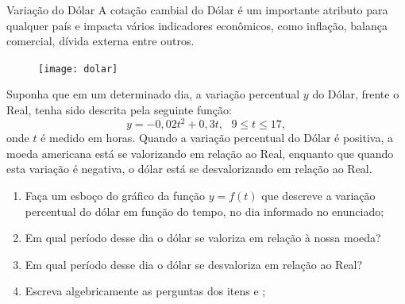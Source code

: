 \label{\detokenize{AF107-8:inequacoes-grau2}}\label{\detokenize{AF107-8::doc}}

\begin{task}{Variação do Dólar}
A cotação cambial do Dólar é um importante atributo para qualquer país e impacta vários indicadores econômicos, como inflação, balança comercial, dívida externa entre outros. 

\begin{figure}[H]
\centering
\noindent\texttt{[image: dolar]}
\end{figure}

Suponha que em um determinado dia, a variação percentual $y$ do Dólar, frente o Real, tenha sido descrita pela seguinte função:
$$
y = -0,02t^2 + 0,3t, \ \ \ 9 \leq t \leq 17, 
$$
onde $t$ é medido em horas. Quando a variação percentual do Dólar é positiva, a moeda americana está se valorizando em relação ao Real, enquanto que quando esta variação é negativa, o dólar está se desvalorizando em relação ao Real.

\begin{enumerate}

\item{} Faça um esboço do gráfico da função $y = f(t)$ que descreve a variação percentual do dólar em função do tempo, no dia informado no enunciado;

\item{} Em qual período desse dia o dólar se valoriza em relação à nossa moeda? 

\item{} Em qual período desse dia o dólar se desvaloriza em relação ao Real?

\item{} Escreva algebricamente as perguntas dos itens  e ;

\end{enumerate}

\end{task}


